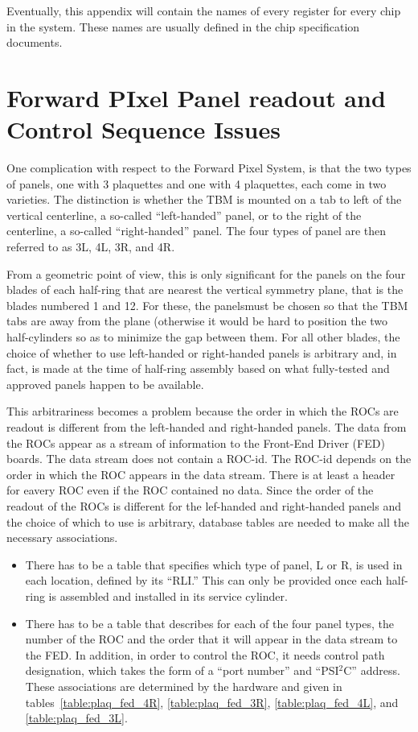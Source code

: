 \documentclass{cmspaper}
\begin{document}
\pagebreak
\begin{appendix}

Eventually, this appendix will contain the names of every register 
for every chip in the system. These names are usually defined in the chip
specification documents.

\section{Forward PIxel Panel readout and Control Sequence Issues}

One complication with respect to the Forward Pixel System, is that the
two types of panels, one with 3 plaquettes and one with 4 plaquettes, each come
in two varieties. The distinction is whether the TBM is mounted on a tab
to left of the vertical centerline, a so-called ``left-handed'' panel, or to 
the right of the centerline, a so-called ``right-handed'' panel. The four types
of panel are then referred to as 3L, 4L, 3R, and 4R. 

From a geometric point of view, this is only significant for the panels
on the four blades of each half-ring that are nearest the vertical symmetry
plane, that is the blades numbered 1 and 12. For these, the panelsmust be 
chosen so that the TBM tabs are away from the plane (otherwise it would be hard
to position the two half-cylinders so as to minimize the gap between them. For
all other blades, the choice of whether to use left-handed or right-handed
panels is arbitrary and, in fact, is made at the time of half-ring assembly
based on  what fully-tested and approved panels happen to be available.

This arbitrariness becomes a problem because the order in which the ROCs
are readout is different from the  left-handed and right-handed
panels. The data from the ROCs appear as a stream of information to the 
Front-End Driver (FED) boards. The data stream does not contain a ROC-id.
The ROC-id depends on the order in which the ROC appears in the data stream.
There is at least a header for eavery ROC even if the ROC contained no
data. Since the order of the readout of the ROCs is different for the
lef-handed and right-handed panels and the choice of which to use is
arbitrary, database tables are needed to make all the necessary associations.
\begin{itemize}
\item There has to be a table that
specifies which type of panel, L or R, is used in each location, defined
by its ``RLI.''  This can only be provided once each half-ring is assembled 
and installed in its service cylinder.
\item There has to be a table that describes for each of the four panel types,
the number of the ROC and the order that it will appear in the data stream
to the FED. In addition, in order to control the ROC, it needs control 
path designation, which takes the form of a ``port number'' and ``PSI$^2$C''
address. These associations are determined by the hardware and given in
tables~\ref{table:plaq_fed_4R}, \ref{table:plaq_fed_3R}, 
\ref{table:plaq_fed_4L}, and \ref{table:plaq_fed_3L}.
\end{itemize} 



\end{appendix}
\end{document}
